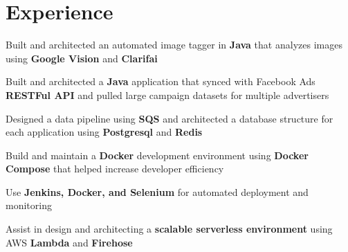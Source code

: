 \documentclass[]{resume}
\begin{document}
\begin{minipage}[t]{0.66\textwidth}


\section{Experience}

\begin{tightemize}
\vspace{\topsep}
\item Built and architected an automated image tagger in \textbf{Java} that analyzes images using \textbf{Google Vision} and \textbf{Clarifai}
\item Built and architected a \textbf{Java} application that synced with Facebook Ads \textbf{RESTFul API} and pulled large campaign datasets for multiple advertisers
\item Designed a data pipeline using \textbf{SQS} and architected a database structure for each application using \textbf{Postgresql} and \textbf{Redis}
\item Build and maintain a \textbf{Docker} development environment using \textbf{Docker Compose} that helped increase developer efficiency
\item Use \textbf{Jenkins, Docker, and Selenium} for automated deployment and monitoring
\item Assist in design and architecting a \textbf{scalable serverless environment} using AWS \textbf{Lambda} and \textbf{Firehose}
\end{tightemize}
\sectionsep




\end{minipage}
\end{document}

